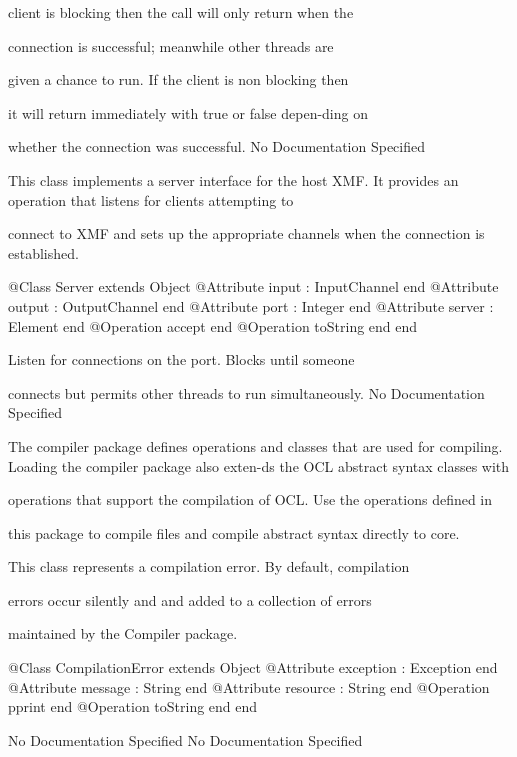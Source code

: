        client is blocking then the call will only return when the

        connection is successful; meanwhile other threads are

        given a chance to run. If the client is non blocking then

        it will return immediately with true or false depen-ding on

        whether the connection was successful.
No Documentation Specified

      This class implements a server interface for the host XMF. It 
      provides an operation that listens for clients attempting to

      connect to XMF and sets up the appropriate channels when the 
      connection is established.
\begin{Interface}
@Class Server extends Object
  @Attribute input : InputChannel end
  @Attribute output : OutputChannel end
  @Attribute port : Integer end
  @Attribute server : Element end
  @Operation accept end
  @Operation toString end
end
\end{Interface}

        Listen for connections on the port. Blocks until someone

        connects but permits other threads to run simultaneously.
No Documentation Specified

      The compiler package defines operations and classes that are used for compiling.
      Loading the compiler package also exten-ds the OCL abstract syntax classes with

      operations that support the compilation of OCL. Use the operations defined in

      this package to compile files and compile abstract syntax directly to core.

      This class represents a compilation error. By default, compilation

      errors occur silently and and added to a collection of errors

      maintained by the Compiler package.
\begin{Interface}
@Class CompilationError extends Object
  @Attribute exception : Exception end
  @Attribute message : String end
  @Attribute resource : String end
  @Operation pprint end
  @Operation toString end
end
\end{Interface}
No Documentation Specified
No Documentation Specified


